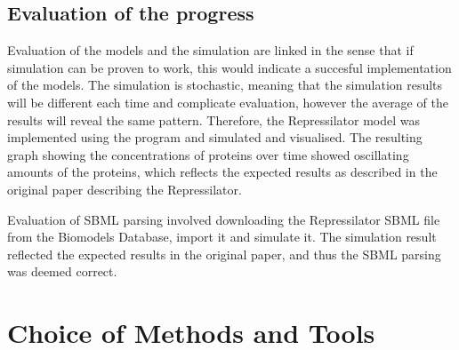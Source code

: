 \documentclass{article}
\begin{document}
	\subsection{Evaluation of the progress}
	\par Evaluation of the models and the simulation are linked in the sense that if simulation can be proven to work, this would indicate a succesful implementation of the models. The simulation is stochastic, meaning that the simulation results will be different each time and complicate evaluation, however the average of the results will reveal the same pattern. Therefore, the Repressilator \cite{repressilator} model was implemented using the program and simulated and visualised. The resulting graph showing the concentrations of proteins over time showed oscillating amounts of the proteins, which reflects the expected results as described in the original paper describing the Repressilator.
	\par Evaluation of SBML parsing involved downloading the Repressilator SBML file from the Biomodels Database, import it and simulate it. The simulation result reflected the expected results in the original paper, and thus the SBML parsing was deemed correct.
	
	\section{Choice of Methods and Tools}
	
	
\end{document}
